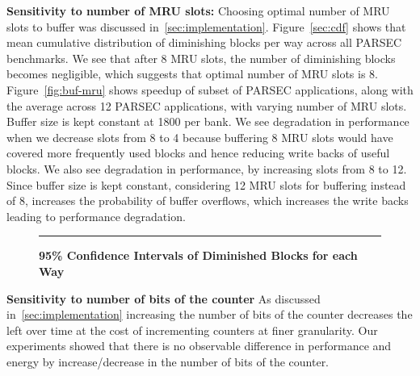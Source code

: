 \noindent\textbf{Sensitivity to number of MRU slots:}
Choosing optimal number of MRU slots to buffer was discussed in~\ref{sec:implementation}. 
Figure~\ref{sec:cdf} shows that mean cumulative distribution of diminishing blocks per 
way across all PARSEC benchmarks. We see that after 8 MRU slots, the number of diminishing blocks 
becomes negligible, which suggests that optimal number of MRU slots is 8. Figure~\ref{fig:buf-mru} shows
speedup of subset of PARSEC applications, along with the average across 12 PARSEC applications, with varying
number of MRU slots. Buffer size is kept constant at 1800 per bank. We see degradation in performance when we decrease
slots from 8 to 4 because buffering 8 MRU slots would have covered more frequently used blocks and hence reducing
write backs of useful blocks. We also see degradation in performance, by increasing slots from 8 to 12. Since buffer
size is kept constant, considering 12 MRU slots for buffering instead of 8, increases the probability of buffer
overflows, which increases the write backs leading to performance degradation. 


\begin{figure*} [t]
\centering
 \hrule
 \caption{\label{fig:confi} \scriptsize \bf 95\% Confidence Intervals of Diminished Blocks for each Way}
\end{figure*}



\noindent\textbf {Sensitivity to number of bits of the counter}
As discussed in~\ref{sec:implementation} increasing the number of bits of the counter decreases the
left over time at the cost of incrementing counters at finer granularity. Our experiments showed that
there is no observable difference in performance and energy by increase/decrease
in the number of bits of the counter.








